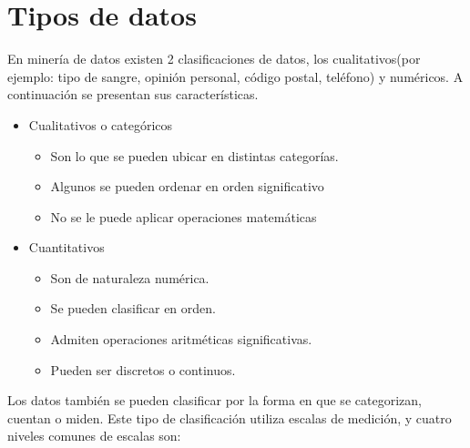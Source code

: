 \section{Tipos de datos}

En miner\'ia de datos existen 2 clasificaciones de datos\cite{Yang2010}, los cualitativos(por ejemplo: tipo de sangre, opini\'on personal, c\'odigo postal, tel\'efono) y num\'ericos. A continuaci\'on se presentan sus caracter\'isticas.

\begin{itemize}
\item Cualitativos o categ\'oricos\cite{Yang2010} 
	\begin{itemize}
	\item Son lo que se pueden ubicar en distintas  categor\'ias.
	\item Algunos se pueden ordenar en orden significativo
	\item No se le puede aplicar operaciones matem\'aticas
	\end{itemize}
	 

\item Cuantitativos\cite{Yang2010}
	\begin{itemize}
	\item Son de naturaleza num\'erica. 
	\item Se pueden clasificar en orden. 
	\item Admiten operaciones aritm\'eticas significativas. 
	\item Pueden ser discretos o continuos.		
	\end{itemize}
\end{itemize}

Los datos tambi\'en se pueden clasificar por la forma en que se categorizan, cuentan o miden. Este tipo de clasificaci\'on utiliza escalas de medici\'on, y cuatro niveles comunes de escalas son: 

